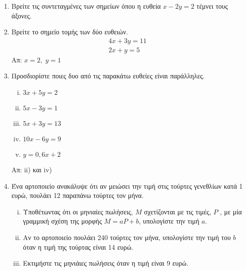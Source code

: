 





\begin{center}
\end{center}

\vspace{\baselineskip}

\begin{enumerate}
    \item Βρείτε τις συντεταγμένες των σημείων όπου η ευθεία $ x-2y=2 $ 
        τέμνει τους άξονες.

    \item Βρείτε το σημείο τομής των δύο ευθειών. 
        \begin{gather*}
            4x+3y=11 \\
            2x+y=5
        \end{gather*}
        \hfill Απ: $ x=2,\; y=1 $ 

    \item Προσδιορίστε ποιες δυο από τις παρακάτω ευθείες είναι παράλληλες.
        \begin{enumerate}[i)]
            \item $ 3x+5y=2 $
            \item $ 5x-3y=1 $
            \item $ 5x+3y=13 $
            \item $ 10x-6y=9 $
            \item $ y=0,6x+2 $
        \end{enumerate}

        \hfill Απ: ii) και iv) 

    \item Ένα αρτοποιείο ανακάλυψε ότι αν μειώσει την τιμή στις τούρτες
        γενεθλίων κατά 1 ευρώ, πουλάει 12 παραπάνω τούρτες τον μήνα.
        \begin{enumerate}[i)]
            \item Υποθέτωντας ότι οι μηνιαίες πωλήσεις, $M$ σχετίζονται
                με τις τιμές, $P$ , με μία γραμμική σχέση της μορφής
                $ M=aP+b $, υπολογίστε την τιμή $ a $.

            \item Αν το αρτοποιείο πουλάει 240 τούρτες τον μήνα, υπολογίστε
                την τιμή του $b$ όταν η τιμή της τούρτας είναι 14 ευρώ.

            \item Εκτιμήστε τις μηνιάιες πωλήσεις όταν η τιμή είναι 9 ευρώ.


\end{enumerate}
\end{enumerate}
